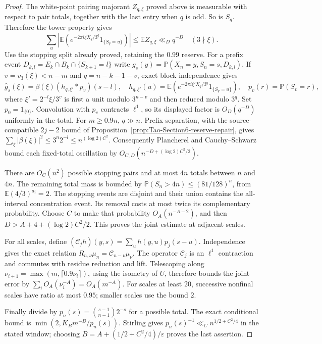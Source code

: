 \begin{proof}
The white-point pairing majorant $Z_{q,\xi}$ proved above is measurable
with respect to pair totals, together with the last entry when $q$ is odd.
So is $S_q$. Therefore the tower property gives
\[
 \sum_u\left|\mathbb E\left(e^{-2\pi i\xi X_q/3^q}
                      1_{\{S_q=u\}}\right)\right|
 \le\mathbb E Z_{q,\xi}\ll_Dq^{-D}
 \quad(3\nmid\xi).
\]
Use the stopping split already proved, retaining the $0.99$ reserve.
For a prefix event $D_{k,l}=E_k\cap B_k\cap\{S_{k+1}=l\}$ write
$g_s(y)=\mathbb P(X_n=y,S_n=s,D_{k,l})$. If
$v=v_3(\xi)<n-m$ and $q=n-k-1-v$, exact block independence gives
\[
 \widehat g_s(\xi)=\beta(\xi)(h_{q,\xi'}*p_v)(s-l),\quad
 h_{q,\xi'}(u)=\mathbb E(e^{-2\pi i\xi'X_q/3^q}1_{\{S_q=u\}}),
 \quad p_v(r)=\mathbb P(S_v=r),
\]
where $\xi'=2^{-l}\xi/3^v$ is first a unit modulo $3^{n-v}$ and then
reduced modulo $3^q$. Set $p_0=1_{\{0\}}$. Convolution with $p_v$
contracts $\ell^1$, so its displayed factor is $O_D(q^{-D})$ uniformly
in the total. For $m\ge0.9n$, $q\gg n$. Prefix separation, with the
source-compatible $2j-2$ bound of
Proposition~\ref{prop:Tao-Section6-reserve-repair}, gives
$\sum_\xi|\beta(\xi)|^2\le3^n2^{-l}\le n^{(\log2)C^2}$.
Consequently Plancherel and Cauchy--Schwarz bound each fixed-total
oscillation by $O_{C,D}(n^{-D+(\log2)C^2/2})$.

There are $O_C(n^2)$ possible stopping pairs and at most $4n$ totals
between $n$ and $4n$. The remaining total mass is bounded by
$\mathbb P(S_n>4n)\le(81/128)^n$, from
$\mathbb E(4/3)^{a_i}=2$. The stopping events are disjoint and their
union contains the all-interval concentration event. Its removal costs
at most twice its complementary probability. Choose $C$ to make that
probability $O_A(n^{-A-2})$, and then
$D>A+4+(\log2)C^2/2$. This proves the joint estimate at adjacent scales.

For all scales, define $(\mathcal C_jh)(y,s)=\sum_u h(y,u)p_j(s-u)$.
Independence gives the exact relation
$R_{n,\nu}\mu_n=\mathcal C_{n-\nu}\mu_\nu$.
The operator $\mathcal C_j$ is an $\ell^1$ contraction and commutes
with residue reduction and lift. Telescoping along
$\nu_{i+1}=\max(m,\lceil0.9\nu_i\rceil)$, using the isometry of $U$,
therefore bounds the joint error by $\sum_i O_A(\nu_i^{-A})=O_A(m^{-A})$.
For scales at least $20$, successive nonfinal scales have ratio at most
$0.95$; smaller scales use the bound $2$.

Finally divide by $p_n(s)=\binom{s-1}{n-1}2^{-s}$ for a possible total.
The exact conditional bound is $\min(2,K_Bm^{-B}/p_n(s))$.
Stirling gives $p_n(s)^{-1}\ll_C n^{1/2+C^2/4}$ in the stated window;
choosing $B=A+(1/2+C^2/4)/\varepsilon$ proves the last assertion.
\end{proof}

